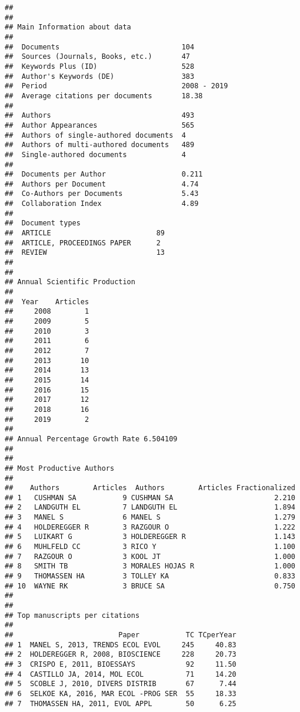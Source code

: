 \documentclass[]{article}
\begin{document}
\begin{verbatim}
## 
## 
## Main Information about data
## 
##  Documents                             104 
##  Sources (Journals, Books, etc.)       47 
##  Keywords Plus (ID)                    528 
##  Author's Keywords (DE)                383 
##  Period                                2008 - 2019 
##  Average citations per documents       18.38 
## 
##  Authors                               493 
##  Author Appearances                    565 
##  Authors of single-authored documents  4 
##  Authors of multi-authored documents   489 
##  Single-authored documents             4 
## 
##  Documents per Author                  0.211 
##  Authors per Document                  4.74 
##  Co-Authors per Documents              5.43 
##  Collaboration Index                   4.89 
##  
##  Document types                     
##  ARTICLE                         89 
##  ARTICLE, PROCEEDINGS PAPER      2 
##  REVIEW                          13 
##  
## 
## Annual Scientific Production
## 
##  Year    Articles
##     2008        1
##     2009        5
##     2010        3
##     2011        6
##     2012        7
##     2013       10
##     2014       13
##     2015       14
##     2016       15
##     2017       12
##     2018       16
##     2019        2
## 
## Annual Percentage Growth Rate 6.504109 
## 
## 
## Most Productive Authors
## 
##    Authors        Articles  Authors        Articles Fractionalized
## 1   CUSHMAN SA           9 CUSHMAN SA                        2.210
## 2   LANDGUTH EL          7 LANDGUTH EL                       1.894
## 3   MANEL S              6 MANEL S                           1.279
## 4   HOLDEREGGER R        3 RAZGOUR O                         1.222
## 5   LUIKART G            3 HOLDEREGGER R                     1.143
## 6   MUHLFELD CC          3 RICO Y                            1.100
## 7   RAZGOUR O            3 KOOL JT                           1.000
## 8   SMITH TB             3 MORALES HOJAS R                   1.000
## 9   THOMASSEN HA         3 TOLLEY KA                         0.833
## 10  WAYNE RK             3 BRUCE SA                          0.750
## 
## 
## Top manuscripts per citations
## 
##                         Paper           TC TCperYear
## 1  MANEL S, 2013, TRENDS ECOL EVOL     245     40.83
## 2  HOLDEREGGER R, 2008, BIOSCIENCE     228     20.73
## 3  CRISPO E, 2011, BIOESSAYS            92     11.50
## 4  CASTILLO JA, 2014, MOL ECOL          71     14.20
## 5  SCOBLE J, 2010, DIVERS DISTRIB       67      7.44
## 6  SELKOE KA, 2016, MAR ECOL -PROG SER  55     18.33
## 7  THOMASSEN HA, 2011, EVOL APPL        50      6.25

\end{verbatim}
\end{document}
